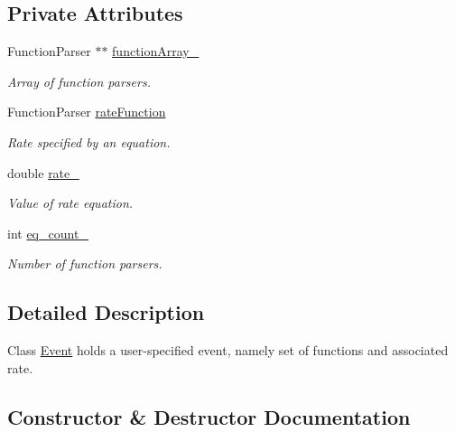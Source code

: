\subsection*{Private Attributes}
\begin{DoxyCompactItemize}
\item 
\mbox{\label{class_event_a7d056badd870a7b89d315b582ff6dbb9}} 
Function\+Parser $\ast$$\ast$ \hyperlink{class_event_a7d056badd870a7b89d315b582ff6dbb9}{function\+Array\+\_\+}
\begin{DoxyCompactList}\small\item\em Array of function parsers. \end{DoxyCompactList}\item 
\mbox{\label{class_event_a5a82a70465e39626ad62d1cfe3fc7617}} 
Function\+Parser \hyperlink{class_event_a5a82a70465e39626ad62d1cfe3fc7617}{rate\+Function}
\begin{DoxyCompactList}\small\item\em Rate specified by an equation. \end{DoxyCompactList}\item 
\mbox{\label{class_event_a42d51bef1ea3b953e9825f3e5bf2210e}} 
double \hyperlink{class_event_a42d51bef1ea3b953e9825f3e5bf2210e}{rate\+\_\+}
\begin{DoxyCompactList}\small\item\em Value of rate equation. \end{DoxyCompactList}\item 
\mbox{\label{class_event_a59244ccd0e0f3654f07715bb3dd6423f}} 
int \hyperlink{class_event_a59244ccd0e0f3654f07715bb3dd6423f}{eq\+\_\+count\+\_\+}
\begin{DoxyCompactList}\small\item\em Number of function parsers. \end{DoxyCompactList}\end{DoxyCompactItemize}


\subsection{Detailed Description}
Class \hyperlink{class_event}{Event} holds a user-\/specified event, namely set of functions and associated rate. 

\subsection{Constructor \& Destructor Documentation}
\mbox{\label{class_event_a5a40dd4708297f7031e29b39e039ae10}} 
